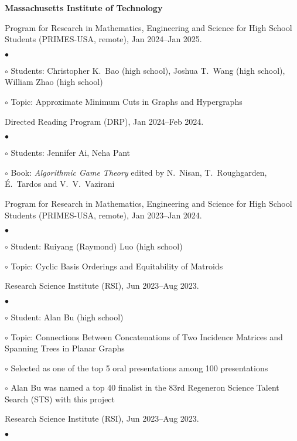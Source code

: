 \documentclass[margin,line]{res}
\newenvironment{list2}{
  \begin{list}{$\bullet$}{%
      \setlength{\itemsep}{0in}
      \setlength{\parsep}{0in} \setlength{\parskip}{0in}
      \setlength{\topsep}{0in} \setlength{\partopsep}{0in}
      \setlength{\leftmargin}{0.2in}}}{\end{list}}
\newenvironment{list3}{
  \begin{list}{\ding{113}}{%
      \setlength{\itemsep}{0.05in}
      \setlength{\parsep}{0.025in} \setlength{\parskip}{0in}
      \setlength{\topsep}{0in} \setlength{\partopsep}{0in}
      \setlength{\leftmargin}{0.17in}}}{\end{list}}
\begin{document}
\begin{resume}
{\bf Massachusetts Institute of Technology}\\
\vspace*{-.1in}
\begin{list3}
\item[] Program for Research in Mathematics, Engineering and Science for High School Students (PRIMES-USA, remote), Jan 2024--Jan 2025.
  \begin{list2}
  \item[$\circ$] Students: Christopher K.\ Bao (high school), Joshua T.\ Wang (high school), William Zhao (high school)
  \item[$\circ$] Topic: Approximate Minimum Cuts in Graphs and Hypergraphs
  \end{list2}
\item[] Directed Reading Program (DRP), Jan 2024--Feb 2024.
  \begin{list2}
  \item[$\circ$] Students: Jennifer Ai, Neha Pant
  \item[$\circ$] Book: \emph{Algorithmic Game Theory} edited by N.\ Nisan, T.\ Roughgarden, \'E.\ Tardos and V.\ V.\ Vazirani
  \end{list2}
\item[] Program for Research in Mathematics, Engineering and Science for High School Students (PRIMES-USA, remote), Jan 2023--Jan 2024.
  \begin{list2}
  \item[$\circ$] Student: Ruiyang (Raymond) Luo (high school)
  \item[$\circ$] Topic: Cyclic Basis Orderings and Equitability of Matroids
  \end{list2}
\item[] Research Science Institute (RSI), Jun 2023--Aug 2023.
  \begin{list2}
  \item[$\circ$] Student: Alan Bu (high school)
  \item[$\circ$] Topic: Connections Between Concatenations of Two Incidence Matrices and Spanning Trees in Planar Graphs
  \item[$\circ$] Selected as one of the top 5 oral presentations among 100 presentations
  \item[$\circ$] Alan Bu was named a top 40 finalist in the $83$rd Regeneron Science Talent Search (STS) with this project
  \end{list2}
\item[] Research Science Institute (RSI), Jun 2023--Aug 2023.
  \begin{list2}

\end{list2}
\end{list3}
\end{resume}
\end{document}
